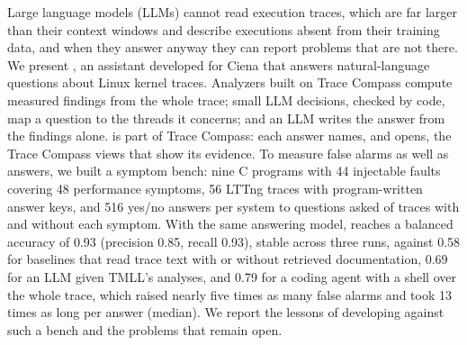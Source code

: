 Large language models (LLMs) cannot read execution traces, which are far larger than their context windows and describe executions absent from their training data, and when they answer anyway they can report problems that are not there. We present \sysname, an assistant developed for Ciena that answers natural-language questions about Linux kernel traces. Analyzers built on Trace Compass compute measured findings from the whole trace; small LLM decisions, checked by code, map a question to the threads it concerns; and an LLM writes the answer from the findings alone. \sysname is part of Trace Compass: each answer names, and opens, the Trace Compass views that show its evidence. To measure false alarms as well as answers, we built a symptom bench: nine C programs with 44 injectable faults covering 48 performance symptoms, 56 LTTng traces with program-written answer keys, and 516 yes/no answers per system to questions asked of traces with and without each symptom. With the same answering model, \sysname reaches a balanced accuracy of 0.93 (precision 0.85, recall 0.93), stable across three runs, against 0.58 for baselines that read trace text with or without retrieved documentation, 0.69 for an LLM given TMLL's analyses, and 0.79 for a coding agent with a shell over the whole trace, which raised nearly five times as many false alarms and took 13 times as long per answer (median). We report the lessons of developing against such a bench and the problems that remain open.
